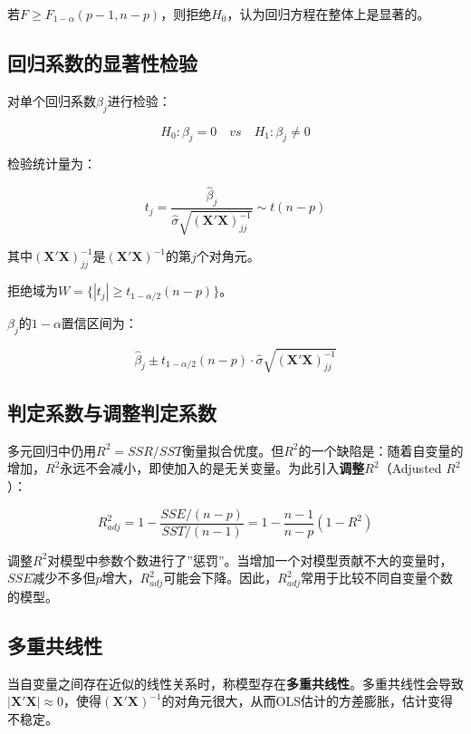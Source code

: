 \documentclass[
]{book}
\begin{document}
若\(F \geq F_{1-\alpha}(p-1, n-p)\)，则拒绝\(H_0\)，认为回归方程在整体上是显著的。

\subsection{回归系数的显著性检验}\label{ux56deux5f52ux7cfbux6570ux7684ux663eux8457ux6027ux68c0ux9a8c}

对单个回归系数\(\beta_j\)进行检验：

\[
H_0: \beta_j = 0 \quad vs \quad H_1: \beta_j \neq 0
\]

检验统计量为：

\[
t_j = \frac{\hat{\beta}_j}{\hat{\sigma} \sqrt{(\mathbf{X}'\mathbf{X})^{-1}_{jj}}} \sim t(n-p)
\]

其中\((\mathbf{X}'\mathbf{X})^{-1}_{jj}\)是\((\mathbf{X}'\mathbf{X})^{-1}\)的第\(j\)个对角元。

拒绝域为\(W = \{|t_j| \geq t_{1-\alpha/2}(n-p)\}\)。

\(\beta_j\)的\(1-\alpha\)置信区间为：

\[
\hat{\beta}_j \pm t_{1-\alpha/2}(n-p) \cdot \hat{\sigma} \sqrt{(\mathbf{X}'\mathbf{X})^{-1}_{jj}}
\]

\subsection{判定系数与调整判定系数}\label{ux5224ux5b9aux7cfbux6570ux4e0eux8c03ux6574ux5224ux5b9aux7cfbux6570}

多元回归中仍用\(R^2 = SSR/SST\)衡量拟合优度。但\(R^2\)的一个缺陷是：随着自变量的增加，\(R^2\)永远不会减小，即使加入的是无关变量。为此引入\textbf{调整\(R^2\)}（Adjusted \(R^2\)）：

\[
R^2_{adj} = 1 - \frac{SSE / (n-p)}{SST / (n-1)} = 1 - \frac{n-1}{n-p}(1 - R^2)
\]

调整\(R^2\)对模型中参数个数进行了''惩罚''。当增加一个对模型贡献不大的变量时，\(SSE\)减少不多但\(p\)增大，\(R^2_{adj}\)可能会下降。因此，\(R^2_{adj}\)常用于比较不同自变量个数的模型。

\subsection{多重共线性}\label{ux591aux91cdux5171ux7ebfux6027}

当自变量之间存在近似的线性关系时，称模型存在\textbf{多重共线性}。多重共线性会导致\(|\mathbf{X}'\mathbf{X}| \approx 0\)，使得\((\mathbf{X}'\mathbf{X})^{-1}\)的对角元很大，从而OLS估计的方差膨胀，估计变得不稳定。
\end{document}
